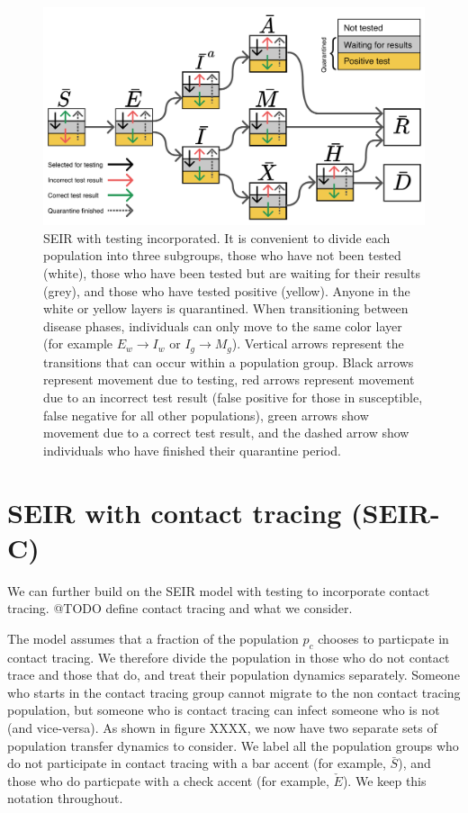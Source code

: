 \documentclass[notitlepage, superscriptaddress]{revtex4-2}
\begin{document}
\begin{figure}
\centering
\includegraphics[width=5in]{SEIR_testing_no_contact}
\caption{\label{f:SEIR-testing}
SEIR with testing incorporated. It is convenient to divide each population into three subgroups, those who have not been tested (white), those who have been tested but are waiting for their results (grey), and those who have tested positive (yellow). Anyone in the white or yellow layers is quarantined. When transitioning between disease phases, individuals can only move to the same color layer (for example $E_{w} \rightarrow I_{w}$ or $I_{g} \rightarrow M_{g}$). Vertical arrows represent the transitions that can occur within a population group. Black arrows represent movement due to testing, red arrows represent movement due to an incorrect test result (false positive for those in susceptible, false negative for all other populations), green arrows show movement due to a correct test result, and the dashed arrow show individuals who have finished their quarantine period.}
\end{figure}


\section{SEIR with contact tracing (SEIR-C)}
We can further build on the SEIR model with testing to incorporate contact tracing. @TODO define contact tracing and what we consider. 

The model assumes that a fraction of the population $p_{c}$ chooses to particpate in contact tracing. We therefore divide the population in those who do not contact trace and those that do, and treat their population dynamics separately. Someone who starts in the contact tracing group cannot migrate to the non contact tracing population, but someone who is contact tracing can infect someone who is not (and vice-versa). As shown in figure XXXX, we now have two separate sets of population transfer dynamics to consider. We label all the population groups who do not participate in contact tracing with a bar accent (for example, $\bar{S}$), and those who do particpate with a check accent (for example, $\check{E}$). We keep this notation throughout. 
\end{document}
